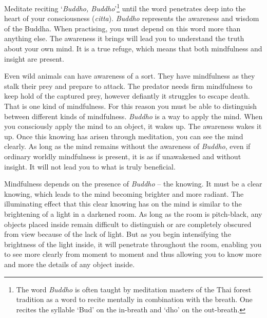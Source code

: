 
Meditate reciting `\textit{Buddho, Buddho}'\footnote{The word \textit{Buddho} is often taught by meditation masters of the Thai forest tradition as a word to recite mentally in combination with the breath. One recites the syllable `Bud' on the in-breath and `dho' on the out-breath.} until the word penetrates deep into the heart of your consciousness (\textit{citta}). \textit{Buddho} represents the awareness and wisdom of the Buddha. When practising, you must depend on this word more than anything else. The awareness it brings will lead you to understand the truth about your own mind. It is a true refuge, which means that both mindfulness and insight are present.

Even wild animals can have awareness of a sort. They have mindfulness as they stalk their prey and prepare to attack. The predator needs firm mindfulness to keep hold of the captured prey, however defiantly it struggles to escape death. That is one kind of mindfulness. For this reason you must be able to distinguish between different kinds of mindfulness. \textit{Buddho} is a way to apply the mind. When you consciously apply the mind to an object, it wakes up. The awareness wakes it up. Once this knowing has arisen through meditation, you can see the mind clearly. As long as the mind remains without the awareness of \textit{Buddho}, even if ordinary worldly mindfulness is present, it is as if unawakened and without insight. It will not lead you to what is truly beneficial.

Mindfulness depends on the presence of \textit{Buddho} -- the knowing. It must be a clear knowing, which leads to the mind becoming brighter and more radiant. The illuminating effect that this clear knowing has on the mind is similar to the brightening of a light in a darkened room. As long as the room is pitch-black, any objects placed inside remain difficult to distinguish or are completely obscured from view because of the lack of light. But as you begin intensifying the brightness of the light inside, it will penetrate throughout the room, enabling you to see more clearly from moment to moment and thus allowing you to know more and more the details of any object inside.
